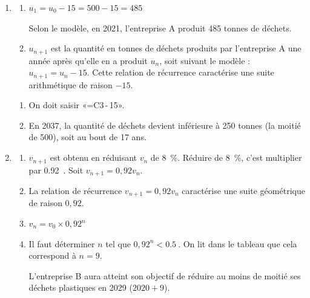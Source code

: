 \documentclass[10pt]{article}
\providecommand{\np}[2][]{{#2~#1}}
\begin{document}
\begin{enumerate}
\item
	\begin{enumerate}
		\item

		$u_{1} = u_{0} - 15 = 500 - 15 = 485 $

		Selon le modèle, en 2021, l'entreprise A produit 485 tonnes de déchets.


		\item
$u_{n+1}$ est la quantité en tonnes de déchets produits par l'entreprise A une année après qu'elle en a produit  $u_{n}$, soit suivant le modèle : $u_{n+1} = u_{n} - 15$. Cette relation de récurrence caractérise une suite arithmétique de raison $-15$.


	\end{enumerate}

	\begin{enumerate}[resume]
		\item
		On doit saisir «\textsf{=C3\,-\,15}».


		\item
En 2037, la quantité de déchets devient inférieure à 250 tonnes (la moitié de 500), soit au bout de 17 ans.

	\end{enumerate}
\item
	\begin{enumerate}
		\item
		$v_{n+1}$ est obtenu en réduisant $v_{n}$ de 8~\%. Réduire de 8~\%, c'est multiplier par \np{0.92}. Soit $v_{n+1}=0,92 v_{n}$.

		\item
		La relation de récurrence $v_{n+1}=0,92 v_{n}$ caractérise une suite géométrique de raison $0,92$.

		\item
		$v_{n} = v_{0}\times 0,92^{n}$

		\item
			Il faut déterminer $n$ tel que $0,92^{n} < \np{0.5}$. On lit dans le tableau que cela correspond à $n=9$.

			L'entreprise B aura atteint son objectif de réduire au moins de moitié ses déchets plastiques en 2029 ($2020+9$).

	\end{enumerate}
\end{enumerate}
\end{document}
